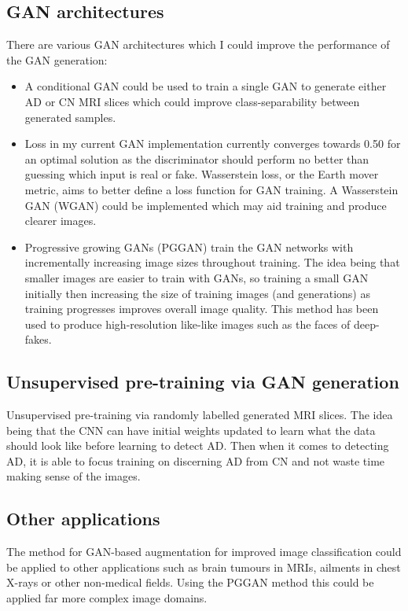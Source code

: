 \documentclass[
    author={Kai Hulme},
    supervisor={Dr Jon Bird},
    degree={BSc},
    title={Generative Adversarial Networks as an Augmentation Technique},
    subtitle={for Alzheimer's Disease Detection in MRI Volumes},
    type={Research},
    year={2021} 
]{dissertation}
\begin{document}
\subsection{GAN architectures}

There are various GAN architectures which I could improve the performance of the GAN generation:

\begin{itemize}
    \item A conditional GAN could be used to train a single GAN to generate either AD or CN MRI slices which could improve class-separability between generated samples.
    \item Loss in my current GAN implementation currently converges towards 0.50 for an optimal solution as the discriminator should perform no better than guessing which input is real or fake. Wasserstein loss, or the Earth mover metric, aims to better define a loss function for GAN training. A Wasserstein GAN (WGAN) could be implemented which may aid training and produce clearer images.
    \item Progressive growing GANs (PGGAN) train the GAN networks with incrementally increasing image sizes throughout training. The idea being that smaller images are easier to train with GANs, so training a small GAN initially then increasing the size of training images (and generations) as training progresses improves overall image quality. This method has been used to produce high-resolution like-like images such as the faces of deep-fakes.
\end{itemize}

\subsection{Unsupervised pre-training via GAN generation}

Unsupervised pre-training via randomly labelled generated MRI slices. The idea being that the CNN can have initial weights updated to learn what the data should look like before learning to detect AD. Then when it comes to detecting AD, it is able to focus training on discerning AD from CN and not waste time making sense of the images.

\subsection{Other applications}

The method for GAN-based augmentation for improved image classification could be applied to other applications such as brain tumours in MRIs, ailments in chest X-rays or other non-medical fields. Using the PGGAN method this could be applied far more complex image domains. 
\end{document}

